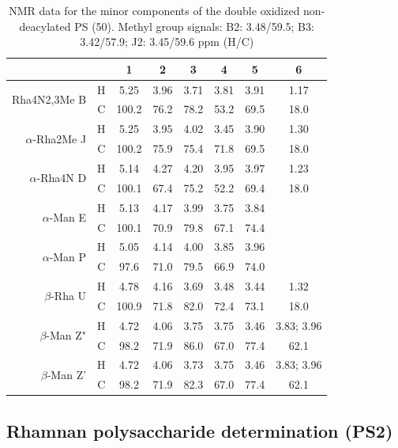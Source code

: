 		 \begin{table}[h]
			 \centering
			 \caption{\ac{NMR} data for the minor components of the double oxidized non-deacylated \ac{PS} (50\cel). Methyl group signals: B2: 3.48/59.5; B3: 3.42/57.9; J2: 3.45/59.6 ppm (H/C)}
			 \label{tbl:lpsends}
			 \begin{tabular}{@{}rccccccc@{}}
				 \toprule
				  &  & 1 & 2 & 3 & 4 & 5 & 6 \\ \midrule
				 \multirow{2}{*}{Rha4N2,3Me B} & H & 5.25 & 3.96 & 3.71 & 3.81 & 3.91 & 1.17 \\
				  & C & 100.2 & 76.2 & 78.2 & 53.2 & 69.5 & 18.0 \\
				 \multirow{2}{*}{$\alpha$-Rha2Me J} & H & 5.25 & 3.95 & 4.02 & 3.45 & 3.90 & 1.30 \\
				  & C & 100.2 & 75.9 & 75.4 & 71.8 & 69.5 & 18.0 \\
				 \multirow{2}{*}{$\alpha$-Rha4N D} & H & 5.14 & 4.27 & 4.20 & 3.95 & 3.97 & 1.23 \\
				  & C & 100.1 & 67.4 & 75.2 & 52.2 & 69.4 & 18.0 \\
				 \multirow{2}{*}{$\alpha$-Man E} & H & 5.13 & 4.17 & 3.99 & 3.75 & 3.84 &  \\
				  & C & 100.1 & 70.9 & 79.8 & 67.1 & 74.4 &  \\
				 \multirow{2}{*}{$\alpha$-Man P} & H & 5.05 & 4.14 & 4.00 & 3.85 & 3.96 &  \\
				  & C & 97.6 & 71.0 & 79.5 & 66.9 & 74.0 &  \\
				 \multirow{2}{*}{$\beta$-Rha U} & H & 4.78 & 4.16 & 3.69 & 3.48 & 3.44 & 1.32 \\
				  & C & 100.9 & 71.8 & 82.0 & 72.4 & 73.1 & 18.0 \\
				 \multirow{2}{*}{$\beta$-Man Z"} & H & 4.72 & 4.06 & 3.75 & 3.75 & 3.46 & 3.83; 3.96 \\
				  & C & 98.2 & 71.9 & 86.0 & 67.0 & 77.4 & 62.1 \\
				 \multirow{2}{*}{$\beta$-Man Z'} & H & 4.72 & 4.06 & 3.73 & 3.75 & 3.46 & 3.83; 3.96 \\
				  & C & 98.2 & 71.9 & 82.3 & 67.0 & 77.4 & 62.1 \\ \bottomrule 
			 \end{tabular}
		 \end{table}

	\subsection{Rhamnan polysaccharide determination (PS2)} %
	\label{sub:rhamnan_polysaccharide_determination_ps2_}

